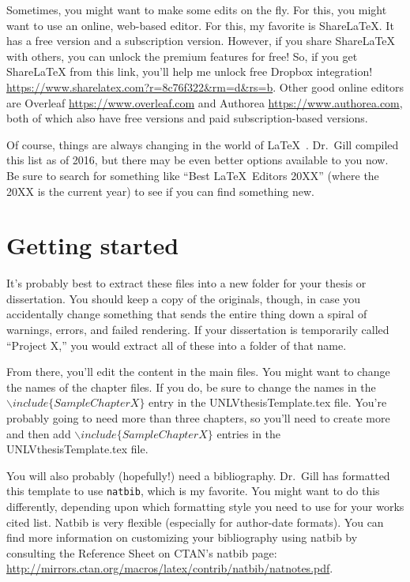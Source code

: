  Sometimes, you might want to make some edits on the fly. For this, you might want to use an online, web-based editor. For this, my favorite is ShareLaTeX. It has a free version and a subscription version. However, if you share ShareLaTeX with others, you can unlock the premium features for free! So, if you get ShareLaTeX from this link, you'll help me unlock free Dropbox integration! \url{https://www.sharelatex.com?r=8c76f322&rm=d&rs=b}. Other good online editors are Overleaf \url{https://www.overleaf.com} and Authorea \url{https://www.authorea.com}, both of which also have free versions and paid subscription-based versions.
 
 Of course, things are always changing in the world of \LaTeX\ . Dr.\ Gill compiled this list as of 2016, but there may be even better options available to you now. Be sure to search for something like ``Best \LaTeX\ Editors 20XX'' (where the 20XX is the current year) to see if you can find something new.
 
\section{Getting started}

It's probably best to extract these files into a new folder for your thesis or dissertation. You should keep a copy of the originals, though, in case you accidentally change something that sends the entire thing down a spiral of warnings, errors, and failed rendering. If your dissertation is temporarily called ``Project X,'' you would extract all of these into a folder of that name.

From there, you'll edit the content in the main files. You might want to change the names of the chapter files. If you do, be sure to change the names in the $\backslash include\{SampleChapterX\}$ entry in the UNLVthesisTemplate.tex file. You're probably going to need more than three chapters, so you'll need to create more and then add $\backslash include\{SampleChapterX\}$ entries in the UNLVthesisTemplate.tex file. 

You will also probably (hopefully!) need a bibliography. Dr.\ Gill has formatted this template to use \texttt{natbib}, which is my favorite. You might want to do this differently, depending upon which formatting style you need to use for your works cited list. Natbib is very flexible (especially for author-date formats). You can find more information on customizing your bibliography using natbib by consulting the Reference Sheet on CTAN's natbib page: \url{http://mirrors.ctan.org/macros/latex/contrib/natbib/natnotes.pdf}.

